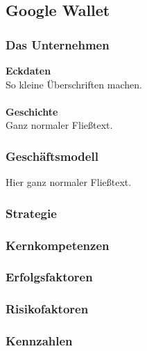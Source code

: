\subsection{Google Wallet}
\subsubsection{Das Unternehmen}

\textbf{Eckdaten}\\
So kleine Überschriften machen.\\
\\
%
%
\textbf{Geschichte}\\
Ganz normaler Fließtext.

\subsubsection{Geschäftsmodell}
Hier ganz normaler Fließtext.

\subsubsection{Strategie}

\subsubsection{Kernkompetenzen}

\subsubsection{Erfolgsfaktoren}

\subsubsection{Risikofaktoren}

\subsubsection{Kennzahlen}
